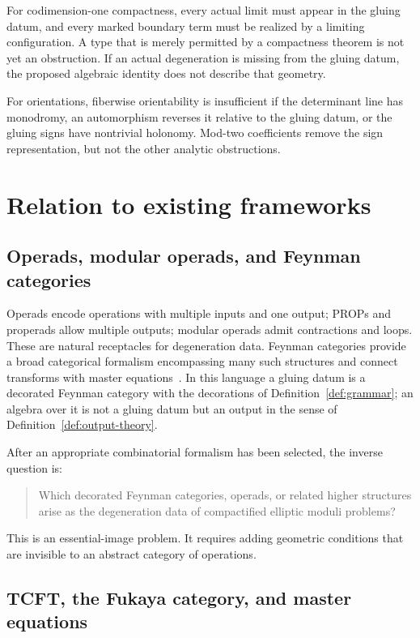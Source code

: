 \documentclass[11pt,letterpaper,twoside]{article}
\theoremstyle{plain}
\theoremstyle{definition}
\theoremstyle{remark}
\let\cite\citep
\begin{document}
For codimension-one compactness, every actual limit must appear in the gluing datum, and every marked boundary term must be realized by a limiting configuration.  A type that is merely permitted by a compactness theorem is not yet an obstruction.  If an actual degeneration is missing from the gluing datum, the proposed algebraic identity does not describe that geometry.

For orientations, fiberwise orientability is insufficient if the determinant line has monodromy, an automorphism reverses it relative to the gluing datum, or the gluing signs have nontrivial holonomy.  Mod-two coefficients remove the sign representation, but not the other analytic obstructions.

\section{Relation to existing frameworks}\label{sec:frameworks}

\subsection{Operads, modular operads, and Feynman categories}

Operads encode operations with multiple inputs and one output; PROPs and properads allow multiple outputs; modular operads admit contractions and loops.  These are natural receptacles for degeneration data.  Feynman categories provide a broad categorical formalism encompassing many such structures and connect transforms with master equations~\cite{kaufmannward2017}.  In this language a gluing datum is a decorated Feynman category with the decorations of Definition~\ref{def:grammar}; an algebra over it is not a gluing datum but an output in the sense of Definition~\ref{def:output-theory}.

After an appropriate combinatorial formalism has been selected, the inverse question is:
\begin{quote}
Which decorated Feynman categories, operads, or related higher structures arise as the degeneration data of compactified elliptic moduli problems?
\end{quote}
This is an essential-image problem.  It requires adding geometric conditions that are invisible to an abstract category of operations.

\subsection{TCFT, the Fukaya category, and master equations}
\end{document}
